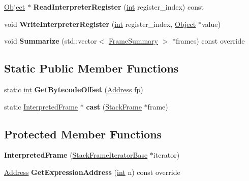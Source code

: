 \begin{DoxyCompactItemize}
\mbox{\label{classv8_1_1internal_1_1InterpretedFrame_a10024c9abd2c97eb3d2106f7f7eee861}} 
\mbox{\hyperlink{classv8_1_1internal_1_1Object}{Object}} $\ast$ {\bfseries Read\+Interpreter\+Register} (\mbox{\hyperlink{classint}{int}} register\+\_\+index) const
\item 
\mbox{\label{classv8_1_1internal_1_1InterpretedFrame_ae394bee44558113608123162a1b942fd}} 
void {\bfseries Write\+Interpreter\+Register} (\mbox{\hyperlink{classint}{int}} register\+\_\+index, \mbox{\hyperlink{classv8_1_1internal_1_1Object}{Object}} $\ast$value)
\item 
\mbox{\label{classv8_1_1internal_1_1InterpretedFrame_aed5e95610300852dd51a544b6bcfa1b3}} 
void {\bfseries Summarize} (std\+::vector$<$ \mbox{\hyperlink{classv8_1_1internal_1_1FrameSummary}{Frame\+Summary}} $>$ $\ast$frames) const override
\end{DoxyCompactItemize}
\subsection*{Static Public Member Functions}
\begin{DoxyCompactItemize}
\item 
\mbox{\label{classv8_1_1internal_1_1InterpretedFrame_a4f3fdd3e5851262fe32bb35ffcea9dea}} 
static \mbox{\hyperlink{classint}{int}} {\bfseries Get\+Bytecode\+Offset} (\mbox{\hyperlink{classuintptr__t}{Address}} fp)
\item 
\mbox{\label{classv8_1_1internal_1_1InterpretedFrame_a0cf5b08ed439a133e5d9141fbb18cba7}} 
static \mbox{\hyperlink{classv8_1_1internal_1_1InterpretedFrame}{Interpreted\+Frame}} $\ast$ {\bfseries cast} (\mbox{\hyperlink{classv8_1_1internal_1_1StackFrame}{Stack\+Frame}} $\ast$frame)
\end{DoxyCompactItemize}
\subsection*{Protected Member Functions}
\begin{DoxyCompactItemize}
\item 
\mbox{\label{classv8_1_1internal_1_1InterpretedFrame_ab0e08279788deabbf22fc02bd884ef6a}} 
{\bfseries Interpreted\+Frame} (\mbox{\hyperlink{classv8_1_1internal_1_1StackFrameIteratorBase}{Stack\+Frame\+Iterator\+Base}} $\ast$iterator)
\item 
\mbox{\label{classv8_1_1internal_1_1InterpretedFrame_a1d43d8624c07917629b0a738dbebc792}} 
\mbox{\hyperlink{classuintptr__t}{Address}} {\bfseries Get\+Expression\+Address} (\mbox{\hyperlink{classint}{int}} n) const override
\end{DoxyCompactItemize}
